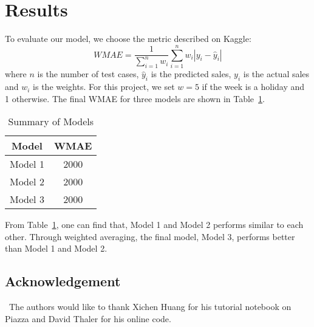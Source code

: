 \documentclass[12pt]{article}
\begin{document}
\section{Results}

To evaluate our model, we choose the metric described on Kaggle:
\begin{equation}
WMAE = \frac{1}{\sum_{i=1}^n w_i} \sum_{i=1}^n w_i | y_i - \hat{y}_i |
\end{equation}
where $n$ is the number of test cases, $\hat{y}_i$ is the predicted sales, $y_i$ is the actual sales and $w_i$ is the weights. For this project, we set $w=5$ if the week is a holiday and 1 otherwise. The final WMAE for three models are shown in Table~\ref{result}.

\begin{table}[htb]
 \caption{Summary of Models} \label{result}
 \vspace{0.1in}
\begin{center}
  \begin{tabular}{  c  c  }
  
    \hline
    Model          &WMAE     \\ \hline
    Model 1         & 2000    \\ \hline
    Model 2         & 2000    \\ \hline
    Model 3         & 2000    \\ \hline
  \end{tabular}
\end{center}
\end{table}

From Table~\ref{result}, one can find that, Model 1 and Model 2 performs similar to each other. Through weighted averaging, the final model, Model 3, performs better than Model 1 and Model 2.

\subsection*{Acknowledgement}

\quad\ The authors would like to thank Xichen Huang for his tutorial notebook on Piazza and David Thaler for his online code.

\vfill\pagebreak

%
\end{document}

